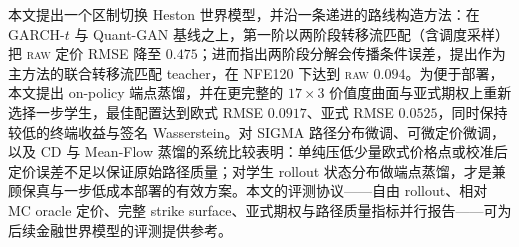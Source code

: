 \documentclass[11pt]{ctexart}
\newcommand{\raw}{\textsc{raw}}
\begin{document}
本文提出一个区制切换 Heston 世界模型，并沿一条递进的路线构造方法：在 GARCH-$t$ 与 Quant-GAN 基线之上，第一阶以两阶段转移流匹配（含调度采样）把 \raw{} 定价 RMSE 降至 $0.475$；进而指出两阶段分解会传播条件误差，提出作为主方法的联合转移流匹配 teacher，在 NFE120 下达到 \raw{} $0.094$。为便于部署，本文提出 on-policy 端点蒸馏，并在更完整的 $17\times3$ 价值度曲面与亚式期权上重新选择一步学生，最佳配置达到欧式 RMSE $0.0917$、亚式 RMSE $0.0525$，同时保持较低的终端收益与签名 Wasserstein。对 SIGMA 路径分布微调、可微定价微调，以及 CD 与 Mean-Flow 蒸馏的系统比较表明：单纯压低少量欧式价格点或校准后定价误差不足以保证原始路径质量；对学生 rollout 状态分布做端点蒸馏，才是兼顾保真与一步低成本部署的有效方案。本文的评测协议——自由 rollout、相对 MC oracle 定价、完整 strike surface、亚式期权与路径质量指标并行报告——可为后续金融世界模型的评测提供参考。



\end{document}
